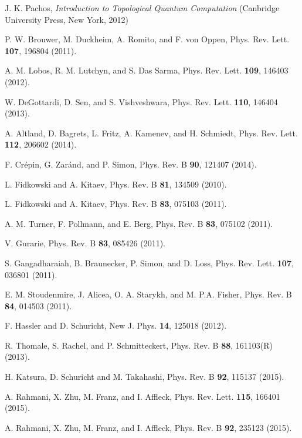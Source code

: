 \documentclass[aps, prb, showpacs, twocolumn, %
amssymb,superscriptaddress]{revtex4}
\begin{document}
\begin{thebibliography}{}
J. K. Pachos, {\it Introduction to Topological Quantum Computation} (Canbridge University Press, New York, 2012)

P. W. Brouwer, M. Duckheim, A. Romito, and F. von Oppen, Phys. Rev. Lett. {\bf 107}, 196804  (2011).

A. M. Lobos, R. M. Lutchyn, and S. Das Sarma, Phys. Rev. Lett. {\bf 109}, 146403 (2012).

W. DeGottardi, D. Sen, and S. Vishveshwara, Phys. Rev. Lett. {\bf 110}, 146404 (2013).

A. Altland, D. Bagrets, L. Fritz, A. Kamenev, and H. Schmiedt, Phys. Rev. Lett. {\bf 112}, 206602  (2014).

F. Cr\'epin, G. Zar\'and, and P. Simon, Phys. Rev. B {\bf 90},  121407 (2014).

L. Fidkowski and A. Kitaev, Phys. Rev. B {\bf 81}, 134509  (2010).

L. Fidkowski and A. Kitaev, Phys. Rev. B {\bf 83}, 075103  (2011).

A. M. Turner, F. Pollmann, and E. Berg, Phys. Rev. B \textbf{83}, 075102 (2011).

V. Gurarie, Phys. Rev. B {\bf 83}, 085426 (2011).

S. Gangadharaiah, B. Braunecker, P. Simon, and D. Loss, Phys. Rev. Lett. {\bf 107}, 036801 (2011).

E. M. Stoudenmire, J. Alicea, O. A. Starykh, and M. P.A. Fisher, Phys. Rev. B {\bf 84}, 014503 (2011).

F. Hassler and D. Schuricht, New J. Phys. {\bf 14}, 125018 (2012).

R. Thomale, S. Rachel, and P. Schmitteckert, Phys. Rev. B {\bf 88}, 161103(R)  (2013).

H. Katsura, D. Schuricht and M. Takahashi, Phys. Rev. B {\bf 92}, 115137 (2015).

A. Rahmani, X. Zhu, M. Franz, and I. Affleck, Phys. Rev. Lett. {\bf 115}, 166401 (2015).

A. Rahmani, X. Zhu, M. Franz, and I. Affleck, Phys. Rev. B {\bf 92}, 235123 (2015).


\end{thebibliography}
\end{document}
